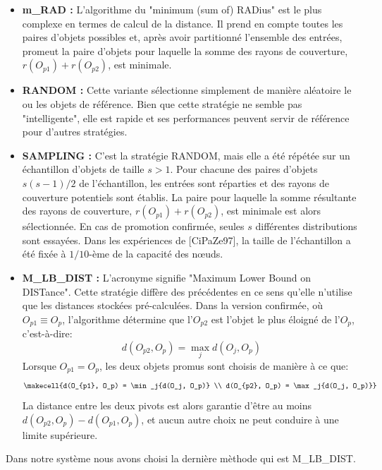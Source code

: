 \begin{itemize}
	\item \textbf{m\_RAD :} L'algorithme du "minimum (sum of) RADius" est le plus complexe en termes de calcul de la distance. Il prend en compte toutes les paires d'objets possibles et, après avoir partitionné l'ensemble des entrées, promeut la paire d'objets pour laquelle la somme des rayons de couverture, $ r(O_{p1}) + r(O_{p2}) $, est minimale.
	\item \textbf{RANDOM :} Cette variante sélectionne simplement de manière aléatoire le ou les objets de référence.
	Bien que cette stratégie ne semble pas "intelligente", elle est rapide et ses performances peuvent servir de référence pour d'autres stratégies.
	\item \textbf{SAMPLING :} C'est la stratégie RANDOM, mais elle a été répétée sur un échantillon d'objets de taille $ s > 1 $. Pour chacune des paires d'objets $ s(s - 1)/2 $ de l'échantillon, les entrées sont réparties et des rayons de couverture potentiels sont établis. La paire pour laquelle la somme résultante des rayons de couverture, $ r(O_{p1})+r(O_{p2}) $, est minimale est alors sélectionnée.
	En cas de promotion confirmée, seules $ s $ différentes distributions sont essayées. Dans les expériences de [CiPaZe97], la taille de l'échantillon a été fixée à $ 1/10 $-ème de la capacité des nœuds.
	\item \textbf{M\_LB\_DIST :} L'acronyme signifie "Maximum Lower Bound on DISTance".
	Cette stratégie diffère des précédentes en ce sens qu'elle n'utilise que les distances stockées pré-calculées. Dans la version confirmée, où $ O_{p1} \equiv O_p $, l'algorithme détermine que l'$ O_{p2} $ est l'objet le plus éloigné de l'$ O_p $, c'est-à-dire:
	\begin{equation}
		 d(O_{p2}, O_p) = \max_j{d(O_j, O_p)}
	\end{equation}
	Lorsque $ O_{p1} = O_p $, les deux objets promus sont choisis de manière à ce que:
	\begin{equation}
	\makecell{d(O_{p1}, O_p) = \min_j{d(O_j, O_p)} \\
		 d(O_{p2}, O_p) = \max_j{d(O_j, O_p)}}
	\end{equation}
	La distance entre les deux pivots est alors garantie d'être au moins\\ $ d(O_{p2}, O_p)-d(O_{p1}, O_p) $, et aucun autre choix ne peut conduire à une limite supérieure.
\end{itemize}
Dans notre système nous avons choisi la dernière mèthode qui est M\_LB\_DIST.

